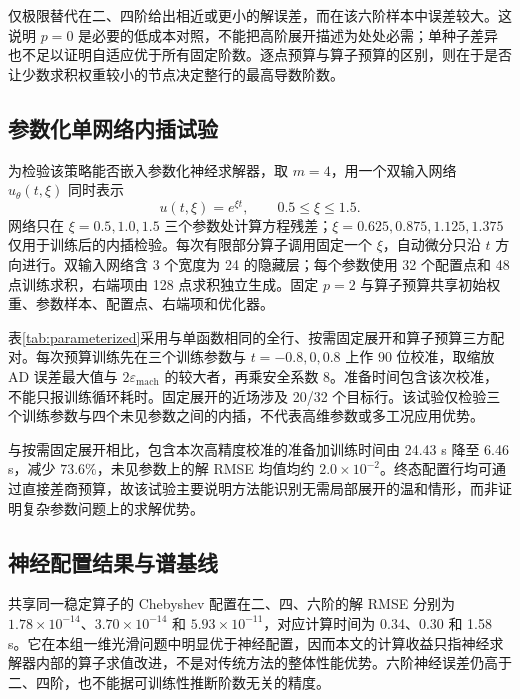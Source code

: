 \documentclass[UTF8,fontset=none,10.5pt,a4paper]{ctexart}
\numberwithin{equation}{section}
\newcommand{\eps}{\varepsilon_{\mathrm{mach}}}
\begin{document}
仅极限替代在二、四阶给出相近或更小的解误差，而在该六阶样本中误差较大。这说明 $p=0$ 是必要的低成本对照，不能把高阶展开描述为处处必需；单种子差异也不足以证明自适应优于所有固定阶数。逐点预算与算子预算的区别，则在于是否让少数求积权重较小的节点决定整行的最高导数阶数。

\subsection{参数化单网络内插试验}

为检验该策略能否嵌入参数化神经求解器，取 $m=4$，用一个双输入网络 $u_\theta(t,\xi)$ 同时表示
\begin{equation}
u(t,\xi)=e^{\xi t},\qquad 0.5\le\xi\le1.5.
\label{eq:parametric-family}
\end{equation}
网络只在 $\xi=0.5,1.0,1.5$ 三个参数处计算方程残差；$\xi=0.625,0.875,1.125,1.375$ 仅用于训练后的内插检验。每次有限部分算子调用固定一个 $\xi$，自动微分只沿 $t$ 方向进行。双输入网络含 3 个宽度为 24 的隐藏层；每个参数使用 32 个配置点和 48 点训练求积，右端项由 128 点求积独立生成。固定 $p=2$ 与算子预算共享初始权重、参数样本、配置点、右端项和优化器。

表\ref{tab:parameterized}采用与单函数相同的全行、按需固定展开和算子预算三方配对。每次预算训练先在三个训练参数与 $t=-0.8,0,0.8$ 上作 90 位校准，取缩放 AD 误差最大值与 $2\eps$ 的较大者，再乘安全系数 8。准备时间包含该次校准，不能只报训练循环耗时。固定展开的近场涉及 20/32 个目标行。该试验仅检验三个训练参数与四个未见参数之间的内插，不代表高维参数或多工况应用优势。



与按需固定展开相比，包含本次高精度校准的准备加训练时间由 24.43 s 降至 6.46 s，减少 $73.6\%$，未见参数上的解 RMSE 均值均约 $2.0\times10^{-2}$。终态配置行均可通过直接差商预算，故该试验主要说明方法能识别无需局部展开的温和情形，而非证明复杂参数问题上的求解优势。

\subsection{神经配置结果与谱基线}

共享同一稳定算子的 Chebyshev 配置在二、四、六阶的解 RMSE 分别为 $1.78\times10^{-14}$、$3.70\times10^{-14}$ 和 $5.93\times10^{-11}$，对应计算时间为 0.34、0.30 和 1.58 s。它在本组一维光滑问题中明显优于神经配置，因而本文的计算收益只指神经求解器内部的算子求值改进，不是对传统方法的整体性能优势。六阶神经误差仍高于二、四阶，也不能据可训练性推断阶数无关的精度。
\end{document}

